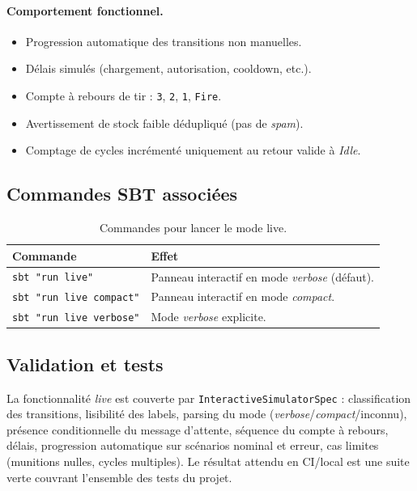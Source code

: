 \documentclass[11pt,a4paper]{article}
\newcommand{\code}[1]{\texttt{#1}}
\begin{document}
\paragraph{Comportement fonctionnel.}
\begin{itemize}[leftmargin=1.2cm,itemsep=1pt]
  \item Progression automatique des transitions non manuelles.
  \item Délais simulés (chargement, autorisation, cooldown, etc.).
  \item Compte à rebours de tir : \code{3}, \code{2}, \code{1},
        \code{Fire}.
  \item Avertissement de stock faible dédupliqué (pas de \emph{spam}).
  \item Comptage de cycles incrémenté uniquement au retour valide à
        \emph{Idle}.
\end{itemize}

\subsection{Commandes SBT associées}

\begin{table}[H]
\centering\small
\begin{tabular}{l l}
\toprule
\rowcolor{tableheader}\textbf{Commande} & \textbf{Effet} \\
\midrule
\code{sbt "run live"}            & Panneau interactif en mode \emph{verbose} (défaut). \\
\code{sbt "run live compact"}    & Panneau interactif en mode \emph{compact}. \\
\code{sbt "run live verbose"}    & Mode \emph{verbose} explicite. \\
\bottomrule
\end{tabular}
\caption{Commandes pour lancer le mode live.}
\end{table}

\subsection{Validation et tests}

La fonctionnalité \emph{live} est couverte par \code{InteractiveSimulatorSpec} :
classification des transitions, lisibilité des labels, parsing du mode
(\emph{verbose}/\emph{compact}/inconnu), présence conditionnelle du message
d'attente, séquence du compte à rebours, délais, progression automatique
sur scénarios nominal et erreur, cas limites (munitions nulles, cycles
multiples). Le résultat attendu en CI/local est une suite verte couvrant
l'ensemble des tests du projet.
\end{document}
